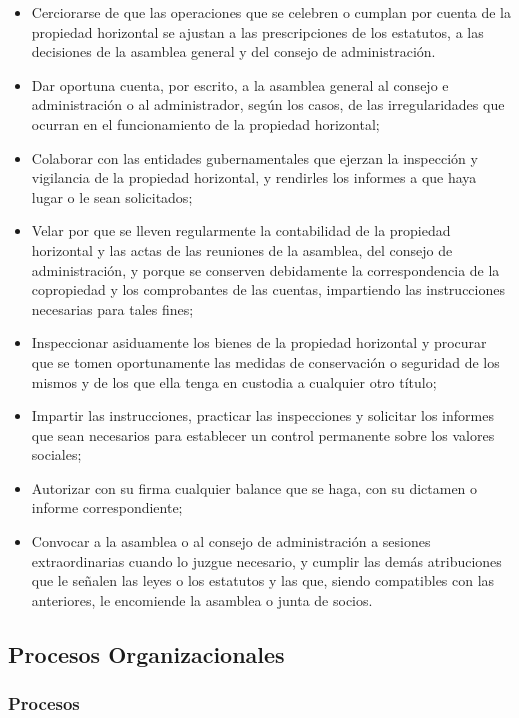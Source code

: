 \begin{itemize}
	
\item Cerciorarse de que las operaciones que se celebren o cumplan por cuenta de la propiedad horizontal se ajustan a las prescripciones de los estatutos, a las decisiones de la asamblea general y del consejo de administración.
\item Dar oportuna cuenta, por escrito, a la asamblea general al consejo e administración o al administrador, según los casos, de las irregularidades que ocurran en el funcionamiento de la propiedad horizontal;
\item Colaborar con las entidades gubernamentales que ejerzan la inspección y vigilancia de la propiedad horizontal, y rendirles los informes a que haya lugar o le sean solicitados;
\item Velar por que se lleven regularmente la contabilidad de la propiedad horizontal y las actas de las reuniones de la asamblea, del consejo de administración, y porque se conserven debidamente la correspondencia de la copropiedad y los comprobantes de las cuentas, impartiendo las instrucciones necesarias para tales fines;
\item Inspeccionar asiduamente los bienes de la propiedad horizontal y procurar que se tomen oportunamente las medidas de conservación o seguridad de los mismos y de los que ella tenga en custodia a cualquier otro título;
\item Impartir las instrucciones, practicar las inspecciones y solicitar los informes que sean necesarios para establecer un control permanente sobre los valores sociales;
\item Autorizar con su firma cualquier balance que se haga, con su dictamen o informe correspondiente;
\item Convocar a la asamblea o al consejo de administración a sesiones extraordinarias cuando lo juzgue necesario, y cumplir las demás atribuciones que le señalen las leyes o los estatutos y las que, siendo compatibles con las anteriores, le encomiende la asamblea o junta de socios.
\end{itemize}	

\subsection{Procesos Organizacionales}

\subsubsection{Procesos}

